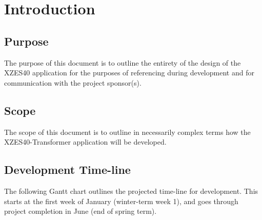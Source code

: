\tableofcontents

\section{Introduction}

\subsection{Purpose}

The purpose of this document is to outline the entirety of the design of the XZES40 application for the purposes of referencing during development and for communication with the project sponsor(s).

\subsection{Scope}

The scope of this document is to outline in necessarily complex terms how the XZES40-Transformer application will be developed.

\subsection{Development Time-line}

The following Gantt chart outlines the projected time-line for development.
This starts at the first week of January (winter-term week 1), and goes through project completion in June (end of spring term).

